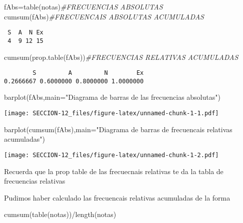 \documentclass[
]{article}
\newenvironment{Shaded}{\begin{snugshade}}{\end{snugshade}}
\newcommand{\AttributeTok}[1]{\textcolor[rgb]{0.77,0.63,0.00}{#1}}
\newcommand{\CommentTok}[1]{\textcolor[rgb]{0.56,0.35,0.01}{\textit{#1}}}
\newcommand{\FunctionTok}[1]{\textcolor[rgb]{0.00,0.00,0.00}{#1}}
\newcommand{\NormalTok}[1]{#1}
\newcommand{\OtherTok}[1]{\textcolor[rgb]{0.56,0.35,0.01}{#1}}
\newcommand{\SpecialCharTok}[1]{\textcolor[rgb]{0.00,0.00,0.00}{#1}}
\newcommand{\StringTok}[1]{\textcolor[rgb]{0.31,0.60,0.02}{#1}}
\begin{document}
\begin{Shaded}
\begin{Highlighting}[]
\NormalTok{fAbs}\OtherTok{=}\FunctionTok{table}\NormalTok{(notas)}\CommentTok{\#FRECUENCIAS ABSOLUTAS}
\FunctionTok{cumsum}\NormalTok{(fAbs)}\CommentTok{\#FRECUENCAIS ABSOLUTAS ACUMULADAS}
\end{Highlighting}
\end{Shaded}

\begin{verbatim}
 S  A  N Ex 
 4  9 12 15 
\end{verbatim}

\begin{Shaded}
\begin{Highlighting}[]
\FunctionTok{cumsum}\NormalTok{(}\FunctionTok{prop.table}\NormalTok{(fAbs))}\CommentTok{\#FRECUENCIAS RELATIVAS ACUMULADAS}
\end{Highlighting}
\end{Shaded}

\begin{verbatim}
        S         A         N        Ex 
0.2666667 0.6000000 0.8000000 1.0000000 
\end{verbatim}

\begin{Shaded}
\begin{Highlighting}[]
\FunctionTok{barplot}\NormalTok{(fAbs,}\AttributeTok{main=}\StringTok{"Diagrama de barras de las frecuencias absolutas"}\NormalTok{)}
\end{Highlighting}
\end{Shaded}

\texttt{[image: SECCION-12\_files/figure-latex/unnamed-chunk-1-1.pdf]}

\begin{Shaded}
\begin{Highlighting}[]
\FunctionTok{barplot}\NormalTok{(}\FunctionTok{cumsum}\NormalTok{(fAbs),}\AttributeTok{main=}\StringTok{"Diagrama de barras de frecuencais relativas acumuladas"}\NormalTok{)}
\end{Highlighting}
\end{Shaded}

\texttt{[image: SECCION-12\_files/figure-latex/unnamed-chunk-1-2.pdf]}

Recuerda que la prop table de las frecuecnais relativas te da la tabla
de frecuencias relativas

Pudimos haber calculado las frecuencais relativas acumuladas de la forma

\begin{Shaded}
\begin{Highlighting}[]
\FunctionTok{cumsum}\NormalTok{(}\FunctionTok{table}\NormalTok{(notas))}\SpecialCharTok{/}\FunctionTok{length}\NormalTok{(notas)}
\end{Highlighting}
\end{Shaded}
\end{document}
